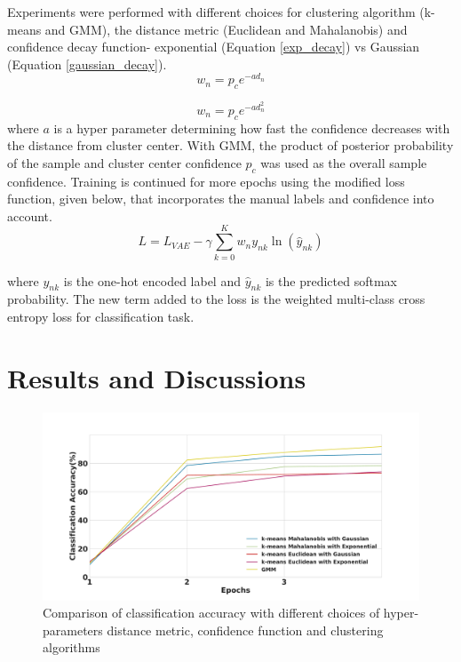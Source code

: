 \documentclass[runningheads]{llncs}
\begin{document}
Experiments were performed with different choices for  clustering algorithm (k-means and GMM), the distance metric (Euclidean and Mahalanobis) and confidence decay function- exponential (Equation \ref{exp_decay}) vs Gaussian (Equation \ref{gaussian_decay}).
\begin{equation}
    w_n = p_ce^{-a d_n}
    \label{exp_decay}
\end{equation}

\vspace{-0.2in}
\begin{equation}
    w_n = p_ce^{-a d_n^2}
    \label{gaussian_decay}
\end{equation}
where $a$ is a hyper parameter determining how fast the confidence decreases with the distance from cluster center.
With GMM, the product of posterior probability of the sample and cluster center confidence $p_c$ was used as the overall sample confidence.
Training is continued for more epochs using the modified loss function, given below, that incorporates the manual labels and confidence into account.
\begin{equation} \label{semi_supervised_loss}
L = L_{VAE}  - \gamma \sum_{k=0}^{K}w_{n}y_{nk}\ln(\hat{y}_{nk})
\end{equation}

where $y_{nk}$ is the one-hot encoded label and $\hat{y}_{nk}$ is the predicted softmax probability.
The new term added to the loss is the weighted multi-class cross entropy loss for classification task.

\section{Results and Discussions}

\begin{figure}[!t]
\centering
  \centering
  \includegraphics[width=.6\linewidth]{images/classification_accuracy_hyperparameter}
\caption{Comparison of classification accuracy with different choices of hyper-parameters distance metric, confidence function and clustering algorithms}
\label{classification_acc}
\end{figure}
\end{document}
